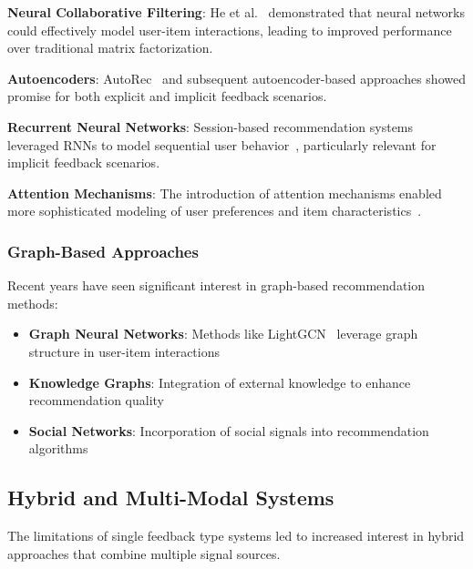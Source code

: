 \textbf{Neural Collaborative Filtering}: He et al.~\cite{he2017neural} demonstrated that neural networks could effectively model user-item interactions, leading to improved performance over traditional matrix factorization.

\textbf{Autoencoders}: AutoRec~\cite{sedhain2015autorec} and subsequent autoencoder-based approaches showed promise for both explicit and implicit feedback scenarios.

\textbf{Recurrent Neural Networks}: Session-based recommendation systems leveraged RNNs to model sequential user behavior~\cite{hidasi2015session}, particularly relevant for implicit feedback scenarios.

\textbf{Attention Mechanisms}: The introduction of attention mechanisms enabled more sophisticated modeling of user preferences and item characteristics~\cite{chen2017attentive}.

\subsubsection{Graph-Based Approaches}
Recent years have seen significant interest in graph-based recommendation methods:
\begin{itemize}
    \item \textbf{Graph Neural Networks}: Methods like LightGCN~\cite{he2020lightgcn} leverage graph structure in user-item interactions
    \item \textbf{Knowledge Graphs}: Integration of external knowledge to enhance recommendation quality~\cite{wang2019kgat}
    \item \textbf{Social Networks}: Incorporation of social signals into recommendation algorithms~\cite{ma2011learning}
\end{itemize}

\subsection{Hybrid and Multi-Modal Systems}

The limitations of single feedback type systems led to increased interest in hybrid approaches that combine multiple signal sources.

